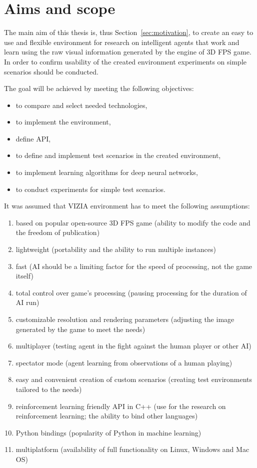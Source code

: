 \documentclass[english,bachelor,a4paper,twoside]{ppfcmthesis}
\begin{document}
\section{Aims and scope}
The main aim of this thesis is, thus Section~\ref{sec:motivation}, to create an easy to use and flexible environment for research on intelligent agents that work and learn using the raw visual information generated by the engine of 3D FPS game. 
In order to confirm usability of the created environment experiments on simple scenarios should be conducted.

The goal will be achieved by meeting the following objectives:
\begin{itemize}
 \item to compare and select needed technologies,
 \item to implement the environment,
 \item define API,
 \item to define and implement test scenarios in the created environment,
 \item to implement learning algorithms for deep neural networks,
 \item to conduct experiments for simple test scenarios.
\end{itemize}
It was assumed that VIZIA environment has to meet the following assumptions:


\begin{enumerate}
\item based on popular open-source 3D FPS game (ability to modify the code and the freedom of publication)
\item lightweight (portability and the ability to run multiple instances)
\item fast (AI should be a limiting factor for the speed of processing, not the game itself)
\item total control over game's processing (pausing processing for the duration of AI run)
\item customizable resolution and rendering parameters (adjusting the image generated by the game to meet the needs)
\item multiplayer (testing agent in the fight against the human player or other AI)
\item spectator mode (agent learning from observations of a human playing)
\item easy and convenient creation of custom scenarios (creating test environments tailored to the needs)
\item reinforcement learning friendly API in C++ (use for the research on reinforcement learning; the ability to bind other languages)
\item Python bindings (popularity of Python in machine learning)
\item multiplatform (availability of full functionality on Linux, Windows and Mac OS)
\end{enumerate}
\end{document}

